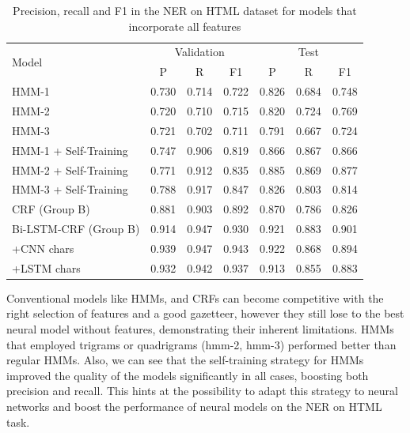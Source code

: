 \documentclass{nle}
\begin{document}
\begin{table}[h]
  \small
  \begin{center}
    \begin{tabular}{ lllllll }
      \toprule
      \multirow{2}{*}{Model} & \multicolumn{3}{c}{Validation} & \multicolumn{3}{c}{Test} \\
                             & \multicolumn{1}{c}{P} & \multicolumn{1}{c}{R} & \multicolumn{1}{c}{F1}
                             & \multicolumn{1}{c}{P} & \multicolumn{1}{c}{R} & \multicolumn{1}{c}{F1} \\
      \midrule
      HMM-1                           & 0.730 & 0.714 & 0.722 & 0.826 & 0.684 & 0.748 \\
      HMM-2                           & 0.720 & 0.710 & 0.715 & 0.820 & 0.724 & 0.769 \\
      HMM-3                           & 0.721 & 0.702 & 0.711 & 0.791 & 0.667 & 0.724 \\
      HMM-1 + Self-Training           & 0.747 & 0.906 & 0.819 & 0.866 & 0.867 & 0.866 \\
      HMM-2 + Self-Training           & 0.771 & 0.912 & 0.835 & 0.885 & 0.869 & 0.877 \\
      HMM-3 + Self-Training           & 0.788 & 0.917 & 0.847 & 0.826 & 0.803 & 0.814 \\
      CRF (Group B)                   & 0.881 & 0.903 & 0.892 & 0.870 & 0.786 & 0.826 \\
      Bi-LSTM-CRF (Group B)           & 0.914 & 0.947 & 0.930 & 0.921 & 0.883 & 0.901 \\
      +CNN chars                      & 0.939 & 0.947 & 0.943 & 0.922 & 0.868 & 0.894 \\
      +LSTM chars                     & 0.932 & 0.942 & 0.937 & 0.913 & 0.855 & 0.883 \\
      \bottomrule
    \end{tabular}
  \end{center}
  \caption{Precision, recall and F1 in the NER on HTML dataset for models that incorporate all features}
  \label{tab:experiment2}
\end{table}

Conventional models like HMMs, and CRFs can become competitive with
the right selection of features and a good gazetteer, however they still lose
to the best neural model without features, demonstrating their inherent limitations.
HMMs that employed trigrams or quadrigrams (hmm-2, hmm-3) performed better than
regular HMMs. Also, we can see that the self-training strategy for HMMs improved 
the quality of the models significantly in all cases, boosting both precision and recall. 
This hints at the possibility to adapt this strategy to neural networks and boost
the performance of neural models on the NER on HTML task.
\end{document}
